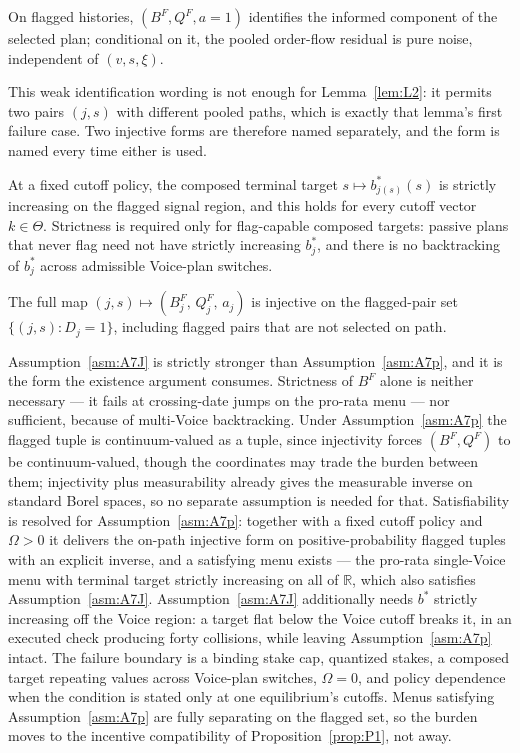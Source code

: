 \begin{assumption}
\label{asm:A7}
On flagged histories, $(B^F,Q^F,a{=}1)$ identifies the informed component of the selected plan;
conditional on it, the pooled order-flow residual is pure noise, independent of $(v,s,\xi)$.
\end{assumption}

This weak identification wording is not enough for Lemma~\ref{lem:L2}: it permits two pairs $(j,s)$
with different pooled paths, which is exactly that lemma's first failure case. Two injective forms
are therefore named separately, and the form is named every time either is used.

\begin{assumption}
\label{asm:A7p}
At a fixed cutoff policy, the composed terminal target $s \mapsto b^*_{j(s)}(s)$ is strictly
increasing on the flagged signal region, and this holds for every cutoff vector $k \in \Theta$.
Strictness is required only for flag-capable composed targets: passive plans that never flag need not
have strictly increasing $b_j^*$, and there is no backtracking of $b_j^*$ across admissible
Voice-plan switches.
\end{assumption}

\begin{assumption}
\label{asm:A7J}
The full map $(j,s) \mapsto (B_j^F,\,Q_j^F,\,a_j)$ is injective on the flagged-pair set
$\{(j,s) : D_j = 1\}$, including flagged pairs that are not selected on path.
\end{assumption}

Assumption~\ref{asm:A7J} is strictly stronger than Assumption~\ref{asm:A7p}, and it is the form the
existence argument consumes. Strictness of $B^F$ alone is neither necessary --- it fails at
crossing-date jumps on the pro-rata menu --- nor sufficient, because of multi-Voice backtracking.
Under Assumption~\ref{asm:A7p} the flagged tuple is continuum-valued as a tuple, since injectivity
forces $(B^F,Q^F)$ to be continuum-valued, though the coordinates may trade the burden between them;
injectivity plus measurability already gives the measurable inverse on standard Borel spaces, so no
separate assumption is needed for that. Satisfiability is resolved for Assumption~\ref{asm:A7p}:
together with a fixed cutoff policy and $\Omega > 0$ it delivers the on-path injective form on
positive-probability flagged tuples with an explicit inverse, and a satisfying menu exists --- the
pro-rata single-Voice menu with terminal target strictly increasing on all of $\mathbb R$, which also
satisfies Assumption~\ref{asm:A7J}. Assumption~\ref{asm:A7J} additionally needs $b^*$ strictly
increasing off the Voice region: a target flat below the Voice cutoff breaks it, in an executed
check producing forty collisions, while leaving Assumption~\ref{asm:A7p} intact. The failure boundary
is a binding stake cap, quantized stakes, a composed target repeating values
across Voice-plan switches, $\Omega = 0$, and policy dependence when the condition is stated only at
one equilibrium's cutoffs. Menus satisfying Assumption~\ref{asm:A7p} are fully separating on the
flagged set, so the burden moves to the incentive compatibility of Proposition~\ref{prop:P1}, not
away.

